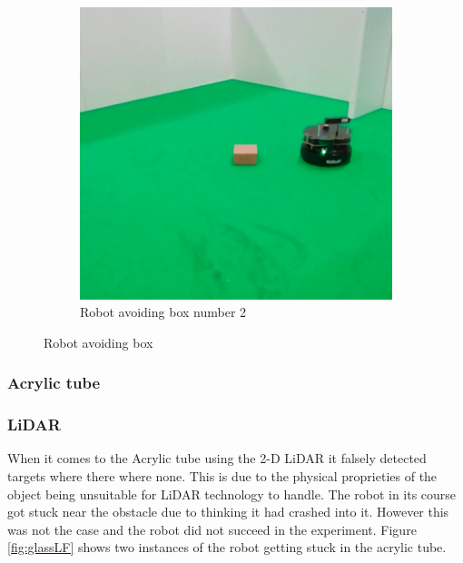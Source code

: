 \begin{figure}[ht!]
\begin{subfigure}[b]{0.38\linewidth}
    \includegraphics[width=\linewidth]{imgs/chapter5/boxRS2.png}
    \caption{Robot avoiding box  number 2}
    \label{fig::boxRS2}
  \end{subfigure}
  \caption{Robot avoiding box}
  \label{fig:boxRS}
\end{figure}

\subsubsection{Acrylic tube}

\subsubsection*{LiDAR}
When it comes to the Acrylic tube using the 2-D \ac{LiDAR} it falsely detected targets where there where none. This is due to the physical proprieties of the object being unsuitable for \ac{LiDAR} technology to handle. The robot in its course got stuck near the obstacle due to thinking it had crashed into it. However this was not the case and the robot did not succeed in the experiment. Figure \ref{fig:glassLF} shows two instances of the robot getting stuck in the acrylic tube.


